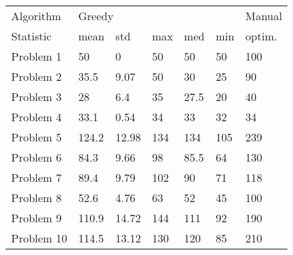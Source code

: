 \begin{tabular}{lllllll}
\toprule
Algorithm & \multicolumn{5}{l}{Greedy} & Manual \\
Statistic &   mean &    std &  max &   med &  min & optim. \\
\midrule
Problem 1  &     50 &      0 &   50 &    50 &   50 &    100 \\
Problem 2  &   35.5 &   9.07 &   50 &    30 &   25 &     90 \\
Problem 3  &     28 &    6.4 &   35 &  27.5 &   20 &     40 \\
Problem 4  &   33.1 &   0.54 &   34 &    33 &   32 &     34 \\
Problem 5  &  124.2 &  12.98 &  134 &   134 &  105 &    239 \\
Problem 6  &   84.3 &   9.66 &   98 &  85.5 &   64 &    130 \\
Problem 7  &   89.4 &   9.79 &  102 &    90 &   71 &    118 \\
Problem 8  &   52.6 &   4.76 &   63 &    52 &   45 &    100 \\
Problem 9  &  110.9 &  14.72 &  144 &   111 &   92 &    190 \\
Problem 10 &  114.5 &  13.12 &  130 &   120 &   85 &    210 \\
\bottomrule
\end{tabular}

